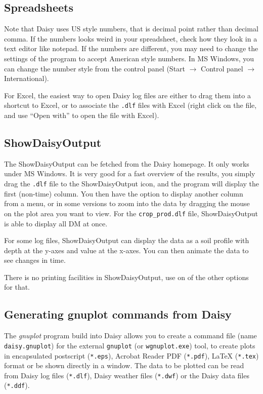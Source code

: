 \documentclass[a4paper]{article}
\begin{document}
\subsection{Spreadsheets}

Note that Daisy uses US style numbers, that is decimal point rather
than decimal comma.  If the numbers looks weird in your spreadsheet,
check how they look in a text editor like notepad.  If the numbers are
different, you may need to change the settings of the program to
accept American style numbers.  In MS Windows, you can change the
number style from the control panel (Start $\rightarrow$ Control panel
$\rightarrow$ International).

For Excel, the easiest way to open Daisy log files are either to
drag them into a shortcut to Excel, or to associate the \texttt{.dlf}
files with Excel (right click on the file, and use ``Open with'' to
open the file with Excel).

\subsection{ShowDaisyOutput}

The ShowDaisyOutput can be fetched from the Daisy homepage.  It
only works under MS Windows.  It is very good for a fast overview of
the results, you simply drag the \texttt{.dlf} file to the
ShowDaisyOutput icon, and the program will display the first
(non-time) column.  You then have the option to display another column
from a menu, or in some versions to zoom into the data by dragging the
mouse on the plot area you want to view.  For the
\texttt{crop\_prod.dlf} file, ShowDaisyOutput is able to display all
DM at once.

For some log files, ShowDaisyOutput can display the data as a soil
profile with depth at the y-axes and value at the x-axes.  You can
then animate the data to see changes in time.

There is no printing facilities in ShowDaisyOutput, use on of the
other options for that. 

\subsection{Generating gnuplot commands from Daisy}
\label{sec:gnuplot-daisy}

The \emph{gnuplot} program build into Daisy allows you to create a
command file (name \texttt{daisy.gnuplot}) for the external
\texttt{gnuplot} (or \texttt{wgnuplot.exe}) tool, to create plots in
encapsulated postscript (\texttt{*.eps}), Acrobat Reader PDF
(\texttt{*.pdf}), LaTeX (\texttt{*.tex}) format or be shown directly
in a window.  The data to be plotted can be read from Daisy log
files (\texttt{*.dlf}), Daisy weather files (\texttt{*.dwf}) or the
Daisy data files (\texttt{*.ddf}).
\end{document}
